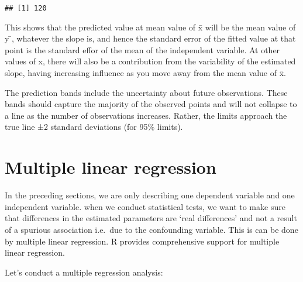 \documentclass[]{book}
\newenvironment{Shaded}{\begin{snugshade}}{\end{snugshade}}
\newcommand{\KeywordTok}[1]{\textcolor[rgb]{0.13,0.29,0.53}{\textbf{#1}}}
\newcommand{\StringTok}[1]{\textcolor[rgb]{0.31,0.60,0.02}{#1}}
\newcommand{\CommentTok}[1]{\textcolor[rgb]{0.56,0.35,0.01}{\textit{#1}}}
\newcommand{\OperatorTok}[1]{\textcolor[rgb]{0.81,0.36,0.00}{\textbf{#1}}}
\newcommand{\NormalTok}[1]{#1}
\theoremstyle{definition}
\theoremstyle{definition}
\theoremstyle{definition}
\theoremstyle{remark}
\begin{document}
\begin{verbatim}
## [1] 120
\end{verbatim}

This shows that the predicted value at mean value of x̄ will be the mean
value of y ̄, whatever the slope is, and hence the standard error of the
fitted value at that point is the standard effor of the mean of the
independent variable. At other values of x, there will also be a
contribution from the variability of the estimated slope, having
increasing influence as you move away from the mean value of x̄.

The prediction bands include the uncertainty about future observations.
These bands should capture the majority of the observed points and will
not collapse to a line as the number of observations increases. Rather,
the limits approach the true line ±2 standard deviations (for 95\%
limits).

\section{Multiple linear regression}\label{multiple-linear-regression}

In the preceding sections, we are only describing one dependent variable
and one independent variable. when we conduct statistical tests, we want
to make sure that differences in the estimated parameters are `real
differences' and not a result of a spurious association i.e.~due to the
confounding variable. This is can be done by multiple linear regression.
R provides comprehensive support for multiple linear regression.

Let's conduct a multiple regression analysis:

\begin{Shaded}
\end{Shaded}
\end{document}
